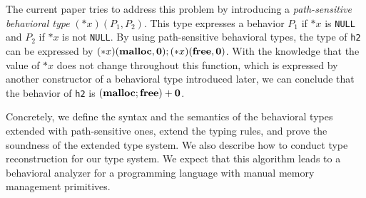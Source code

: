 The current paper tries to address this problem by introducing a
\emph{path-sensitive behavioral type} $(*x)(P_1, P_2)$.  This type
expresses a behavior $P_1$ if $*x$ is
\verb|NULL| and $P_2$ if $*x$ is not \verb|NULL|.  By using
path-sensitive behavioral types, the type of \verb|h2| can be expressed
by $(*x)(\mathbf{malloc}, \mathbf{0}); (*x)(\mathbf{free}, \mathbf{0})$.  With the knowledge
that the value of $*x$ does not change throughout this function, which
is expressed by another constructor of a behavioral type introduced
later, we can conclude that the behavior of \verb|h2| is $(\mathbf{malloc};
\mathbf{free}) + \mathbf{0}$.

Concretely, we define the syntax and the semantics of the behavioral
types extended with path-sensitive ones, extend the typing rules, and
prove the soundness of the extended type system.  We also describe how
to conduct type reconstruction for our type system.  We expect that this
algorithm leads to a behavioral analyzer for a programming language with
manual memory management primitives.





